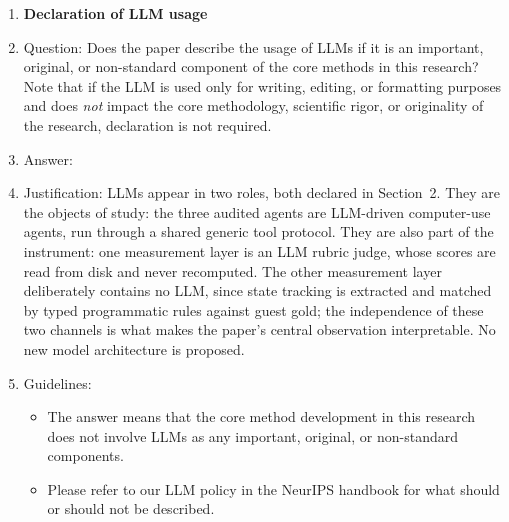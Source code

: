 \begin{enumerate}
\item {\bf Declaration of LLM usage}
    \item[] Question: Does the paper describe the usage of LLMs if it is an important, original, or non-standard component of the core methods in this research? Note that if the LLM is used only for writing, editing, or formatting purposes and does \emph{not} impact the core methodology, scientific rigor, or originality of the research, declaration is not required.
    \item[] Answer: \answerYes{}
    \item[] Justification: LLMs appear in two roles, both declared in Section~2. They are the objects of study: the three audited agents are LLM-driven computer-use agents, run through a shared generic tool protocol. They are also part of the instrument: one measurement layer is an LLM rubric judge, whose scores are read from disk and never recomputed. The other measurement layer deliberately contains no LLM, since state tracking is extracted and matched by typed programmatic rules against guest gold; the independence of these two channels is what makes the paper's central observation interpretable. No new model architecture is proposed.
    \item[] Guidelines:
    \begin{itemize}
        \item The answer \answerNA{} means that the core method development in this research does not involve LLMs as any important, original, or non-standard components.
        \item Please refer to our LLM policy in the NeurIPS handbook for what should or should not be described.
    \end{itemize}

\end{enumerate}
